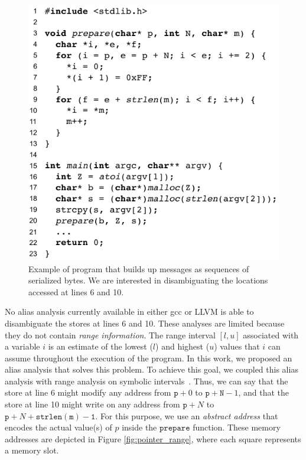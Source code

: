 \documentclass[12pt]{article}
\begin{document}
\begin{figure}[t]
  \centering
\includegraphics{img/ex0_src.pdf}
  \caption{Example of program that builds up messages as sequences of
  serialized bytes. We are interested in disambiguating the locations accessed
  at lines 6 and 10.}
  \label{fig:exmotiv}
\end{figure}

No alias analysis currently available in either gcc or LLVM is able to
disambiguate the stores at lines 6 and 10.
These analyses are limited because they do not contain {\em range information}.
The range interval $[l, u]$ associated with a variable $i$ is
an estimate of
the lowest ($l$) and highest ($u$) values that $i$ can assume
throughout the execution of the program.
In this work, we proposed an alias analysis that solves this problem.
To achieve this goal, we coupled this alias analysis with range
analysis on symbolic intervals~\cite{Blume94}.
Thus, we can say that the store at line 6 might modify any address from
$\mathtt{p} + 0$ to $\mathtt{p} + \mathtt{N} - 1$, and that the store at line 10
might write on any address from $\mathtt{p} + N$ to $\mathtt{p} + N + 
\mathtt{strlen(m) - 1}$.
For this purpose, we use an \emph{abstract address} that
encodes the actual value(s) of $p$ inside the $\mathtt{prepare}$
function.
These memory addresses are depicted in Figure \ref{fig:pointer_range}, where each
square represents a memory slot.
\end{document}
